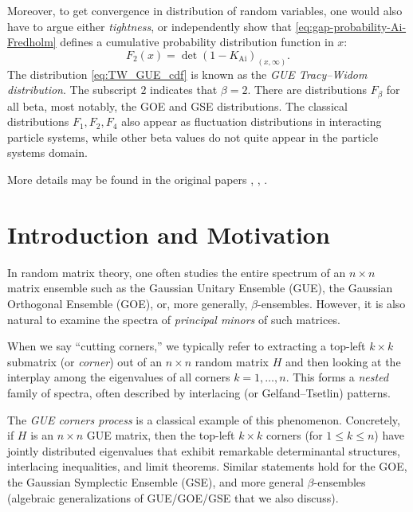 \documentclass[letterpaper,11pt,oneside,reqno]{article}
\numberwithin{equation}{section}
\theoremstyle{definition}
\begin{document}
Moreover, to get convergence in distribution of random variables,
one would also have to argue either \emph{tightness},
or independently show that
\eqref{eq:gap-probability-Ai-Fredholm} defines a
cumulative probability
distribution function in $x$:
\begin{equation}
	\label{eq:TW_GUE_cdf}
	F_2(x)=\det\left( 1-K_{\mathrm{Ai}} \right)_{(x,\infty)}.
\end{equation}
The distribution \eqref{eq:TW_GUE_cdf} is known as the \emph{GUE Tracy--Widom distribution}.
The subscript $2$ indicates that $\beta=2$. There are distributions
$F_\beta$ for all beta, most notably, the GOE and GSE distributions.
The classical distributions $F_1,F_2,F_4$ also appear as fluctuation distributions
in interacting particle systems, while other beta values do
not quite appear in the particle systems
domain.

More details
may be found in the original papers
\cite{tracy1993level},
\cite{Forrester1993},
\cite{tracy_widom1994level_airy}.





\section{Introduction and Motivation}


In random matrix theory, one often studies the entire spectrum of an $n\times n$ matrix ensemble such as the Gaussian Unitary Ensemble (GUE), the Gaussian Orthogonal Ensemble (GOE), or, more generally, $\beta$-ensembles. However, it is also natural to examine the spectra of \emph{principal minors} of such matrices.

When we say ``cutting corners,'' we typically refer to extracting a top-left $k\times k$ submatrix (or \emph{corner}) out of an $n\times n$ random matrix $H$ and then looking at the interplay among the eigenvalues of all corners $k=1,\dots,n$. This forms a \emph{nested} family of spectra, often described by interlacing (or Gelfand--Tsetlin) patterns.

The \emph{GUE corners process} is a classical example of this phenomenon. Concretely, if $H$ is an $n\times n$ GUE matrix, then the top-left $k\times k$ corners (for $1\le k\le n$) have jointly distributed eigenvalues that exhibit remarkable determinantal structures, interlacing inequalities, and limit theorems. Similar statements hold for the GOE, the Gaussian Symplectic Ensemble (GSE), and more general $\beta$-ensembles (algebraic generalizations of GUE/GOE/GSE that we also discuss).
\end{document}
